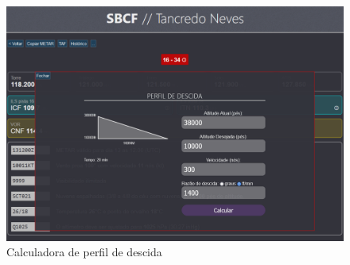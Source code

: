 \begin{figure}[H]
    \begin{center}
    \includegraphics[width=\linewidth]{img/descent.png}
    \caption{Calculadora de perfil de descida}
    \label{fig:wind-calc}
    \end{center}
\end{figure}

